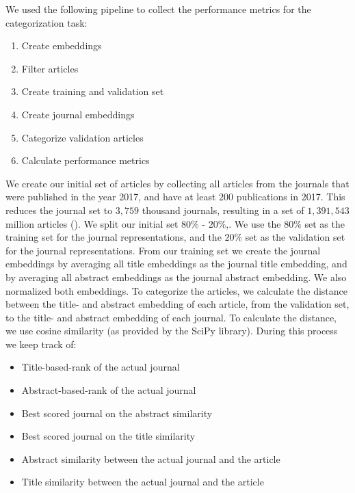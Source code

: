 \documentclass[../../Thesis.tex]{subfiles}
\begin{document}
We used the following pipeline to collect the performance metrics for the categorization task:
\begin{enumerate}
\item{Create embeddings}
\item{Filter articles}
\item{Create training and validation set}
\item{Create journal embeddings}
\item{Categorize validation articles}
\item{Calculate performance metrics}
\end{enumerate}
  
We create our initial set of articles by collecting all articles from the journals that were published in the year 2017, and have at least 200 publications in 2017. This reduces the journal set to $3,759$ thousand journals, resulting in a set of $1,391,543$ million articles ().
We split our initial set  $80\%$ - $20\%$,. We use the $80\%$ set as the training set for the journal representations, and the $20\%$ set as the validation set for the journal representations.
From our training set we create the journal embeddings by averaging all title embeddings as the journal title embedding, and by averaging all abstract embeddings as the journal abstract embedding. We also normalized both embeddings. 
To categorize the articles, we calculate the distance between the title- and abstract embedding of each article, from the validation set, to the title- and abstract embedding of each journal. To calculate the distance, we use cosine similarity (as provided by the SciPy library\cite{SciPy}). During this process we keep track of:
\begin{itemize}
\item{Title-based-rank of the actual journal}
\item{Abstract-based-rank of the actual journal}
\item{Best scored journal on the abstract similarity}
\item{Best scored journal on the title similarity}
\item{Abstract similarity between the actual journal and the article}
\item{Title similarity between the actual journal and the article}
\end{itemize}
\end{document}
